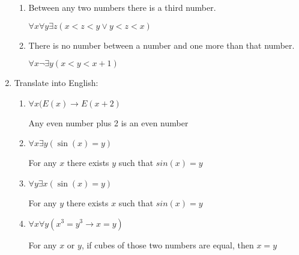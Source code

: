 \documentclass[11pt, a4paper]{article}
\newcommand\setItemNumber[1]{\setcounter{enumi}{\numexpr#1-1\relax}}
\begin{document}
\begin{enumerate}
\begin{enumerate}
            \item Between any two numbers there is a third number.

                $\forall x \forall y\exists z(x < z < y \lor y < z < x)$

            \item There is no number between a number and one more than that number.

                $\forall x \neg \exists y( x < y < x + 1)$

        \end{enumerate}

    \setItemNumber{17}
    \item Translate into English:
        \begin{enumerate}
            \item $\forall x (E(x) \rightarrow E(x + 2)$

                Any even number plus 2 is an even number

            \item $\forall x \exists y(\sin(x) = y)$

                For any $x$ there exists $y$ such that $sin(x) = y$

            \item $\forall y \exists x(\sin(x) = y)$

                For any $y$ there exists $x$ such that $sin(x) = y$

            \item $\forall x \forall y(x^3 = y^3 \rightarrow x = y)$

                For any $x$ or $y$, if cubes of those two numbers are equal, then $x = y$

        \end{enumerate}
\end{enumerate}
\end{document}
